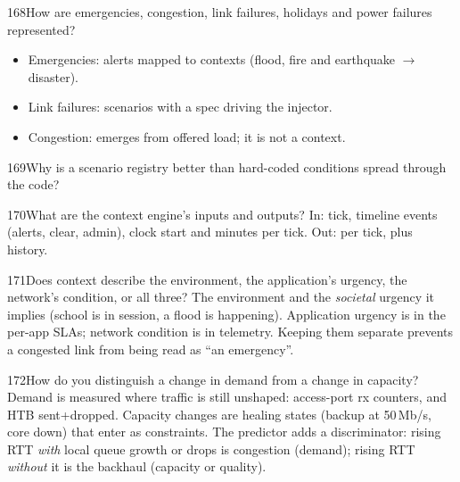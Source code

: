 \begin{qa}{168}{How are emergencies, congestion, link failures, holidays and power failures represented?}
\begin{itemize}
\item Emergencies: alerts mapped to contexts (flood, fire and earthquake $\to$ disaster).
\item Link failures: scenarios with a  spec driving the injector.
\item Congestion: emerges from offered load; it is not a context.
\end{itemize}
\end{qa}

\begin{qa}{169}{Why is a scenario registry better than hard-coded conditions spread through the code?}
\end{qa}

\begin{qa}{170}{What are the context engine's inputs and outputs?}
In: tick, timeline events (alerts, clear, admin), clock start and minutes per tick.
Out:  per tick, plus history.
\end{qa}

\begin{qa}{171}{Does context describe the environment, the application's urgency, the network's condition, or all three?}
The environment and the \emph{societal} urgency it implies (school is in session, a flood is happening). Application
urgency is in the per-app SLAs; network condition is in telemetry. Keeping them separate prevents a congested link
from being read as ``an emergency''.
\end{qa}

\begin{qa}{172}{How do you distinguish a change in demand from a change in capacity?}
Demand is measured where traffic is still unshaped: access-port rx counters, and HTB sent+dropped. Capacity changes
are healing states (backup at 50\,Mb/s, core down) that enter as constraints. The predictor adds a discriminator:
rising RTT \emph{with} local queue growth or drops is congestion (demand); rising RTT \emph{without} it is the
backhaul (capacity or quality).
\end{qa}

